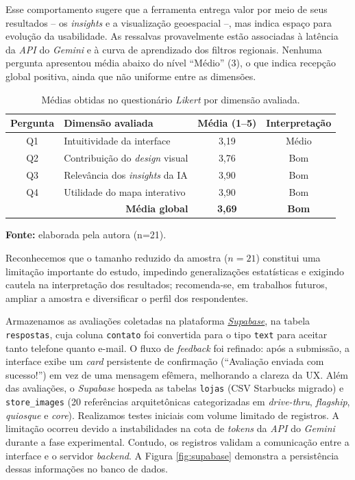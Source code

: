Esse comportamento sugere que a ferramenta entrega valor por meio de seus resultados -- os \textit{insights} e a visualização geoespacial --, mas indica espaço para evolução da usabilidade. As ressalvas provavelmente estão associadas à latência da \textit{API} do \textit{Gemini} e à curva de aprendizado dos filtros regionais. Nenhuma pergunta apresentou média abaixo do nível ``Médio'' (3), o que indica recepção global positiva, ainda que não uniforme entre as dimensões.

\begin{table}[H]
    \centering
    \captionsetup{justification=raggedright, singlelinecheck=false}
    \caption{Médias obtidas no questionário \textit{Likert} por dimensão avaliada.}
    \label{tab:likert}
    \begin{tabular}{|c|p{}|c|c|}
    \hline
    \textbf{Pergunta} & \textbf{Dimensão avaliada} & \textbf{Média (1--5)} & \textbf{Interpretação} \\ \hline
    Q1 & Intuitividade da interface & 3,19 & Médio \\ \hline
    Q2 & Contribuição do \textit{design} visual & 3,76 & Bom \\ \hline
    Q3 & Relevância dos \textit{insights} da IA & 3,90 & Bom \\ \hline
    Q4 & Utilidade do mapa interativo & 3,90 & Bom \\ \hline
    \multicolumn{2}{|r|}{\textbf{Média global}} & \textbf{3,69} & \textbf{Bom} \\ \hline
    \end{tabular}
    \vspace{0,1cm}
    \centering
    {\footnotesize \textbf{Fonte:} elaborada pela autora (n=21).\par}
\end{table}

Reconhecemos que o tamanho reduzido da amostra ($n=21$) constitui uma limitação importante do estudo, impedindo generalizações estatísticas e exigindo cautela na interpretação dos resultados; recomenda-se, em trabalhos futuros, ampliar a amostra e diversificar o perfil dos respondentes.

Armazenamos as avaliações coletadas na plataforma \href{https://supabase.com/}{\textit{Supabase}}, na tabela \texttt{respostas}, cuja coluna \texttt{contato} foi convertida para o tipo \texttt{text} para aceitar tanto telefone quanto e-mail. O fluxo de \textit{feedback} foi refinado: após a submissão, a interface exibe um \textit{card} persistente de confirmação (``Avaliação enviada com sucesso!'') em vez de uma mensagem efêmera, melhorando a clareza da UX. Além das avaliações, o \textit{Supabase} hospeda as tabelas \texttt{lojas} (CSV Starbucks migrado) e \texttt{store\_images} (20 referências arquitetônicas categorizadas em \textit{drive-thru}, \textit{flagship}, \textit{quiosque} e \textit{core}). Realizamos testes iniciais com volume limitado de registros. A limitação ocorreu devido a instabilidades na cota de \textit{tokens} da \textit{API} do \textit{Gemini} durante a fase experimental. Contudo, os registros validam a comunicação entre a interface e o servidor \textit{backend}. A Figura \ref{fig:supabase} demonstra a persistência dessas informações no banco de dados.

